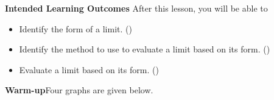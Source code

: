\documentclass[10pt]{article}
\begin{document}
\pagestyle{otherpages}
\thispagestyle{firstpage}

\textbf{Intended Learning Outcomes}
After this lesson, you will be able to 

\begin{itemize}
    \item Identify the form of a limit. ()
    \item Identify the method to use to evaluate a limit based on its form. ()
    \item Evaluate a limit based on its form. ()
\end{itemize}

\vspace{-0.5cm}

\hrulefill

{\bf\color{blue}Warm-up}\exercise Four graphs are given below.\\
\end{document}
